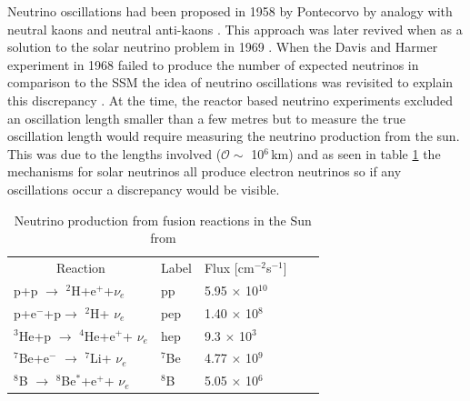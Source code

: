Neutrino oscillations had been proposed in 1958 by Pontecorvo by analogy with neutral kaons and neutral anti-kaons   \cite{griffiths2008neutrinoOscillations} \cite{pontecorvo1958_OscillationProposal}. This approach was later revived when as a solution to the solar neutrino problem in 1969 \cite{pontecorvo_gibov_1969_solar_oscillation}. When the Davis and Harmer experiment in 1968 failed to produce the number of expected neutrinos in comparison to the SSM the idea of neutrino oscillations was revisited to explain this discrepancy \cite{pontecorvo_gibov_1969_solar_oscillation}. At the time, the reactor based neutrino experiments excluded an oscillation length smaller than a few metres but to measure the true oscillation length would require measuring the neutrino production from the sun. This was due to the lengths involved ($\mathcal{O} \sim$ 10$^6$\,km) \cite{pontecorvo_gibov_1969_solar_oscillation} and as seen in table \ref{solar_nuetrino_table} the mechanisms for solar neutrinos all produce electron neutrinos so if any oscillations occur a discrepancy would be visible. 

\begin{table}[!h]
\centering
\begin{tabular}{lllll}  
\toprule
\multicolumn{1}{c}{Reaction} & \multicolumn{1}{c}{Label} & \multicolumn{1}{c}{Flux [cm$^{-2}$s$^{-1}$]}
\\
\cmidrule(r){1-1}
\cmidrule(r){2-2}
\cmidrule(r){3-3}
p+p $\rightarrow$ $^2$H+e$^+$+$\nu_e$           & pp                & 5.95 $\times$ 10$^{10}$\\
p+e$^-$+p$\rightarrow$ $^2$H+ $\nu_e$           & pep               & 1.40 $\times$ 10$^{8}$\\
$^3$He+p $\rightarrow$ $^4$He+e$^+$+ $\nu_e$    & hep               & 9.3  $\times$ 10$^{3}$\\
$^7$Be+e$^-$ $\rightarrow$ $^7$Li+ $\nu_e$      & $^7$Be            & 4.77 $\times$ 10$^{9}$\\
$^8$B $\rightarrow$ $^8$Be$^*$+e$^+$+ $\nu_e$   & $^8$B             & 5.05 $\times$ 10$^{6}$\\
\bottomrule   
\end{tabular}
\caption{Neutrino production from fusion reactions in the Sun from \cite{Bellerive:2003rj} }
\label{solar_nuetrino_table}
\end{table}


